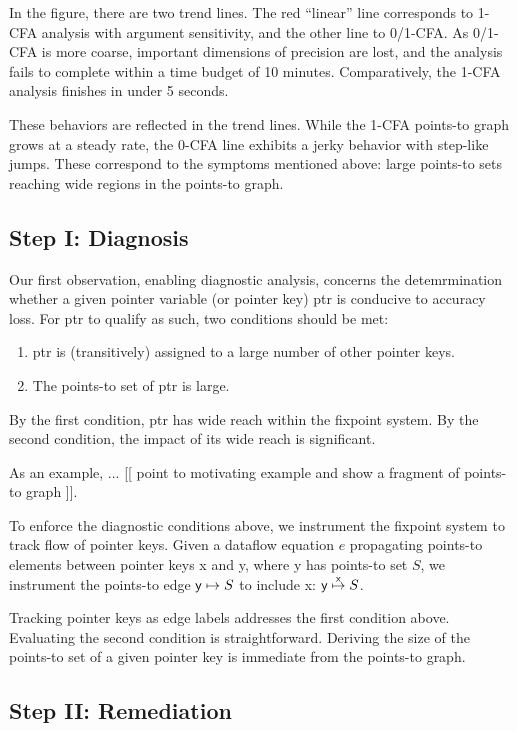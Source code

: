 \documentclass[a4paper,UKenglish]{lipics}
\begin{document}
In the figure, there are two trend lines. The red ``linear'' line corresponds to 1-CFA analysis with argument sensitivity, and the other line to 0/1-CFA. As 0/1-CFA is more coarse, important dimensions of precision are lost, and the analysis fails to complete within a time budget of 10 minutes. Comparatively, the 1-CFA analysis finishes in under 5 seconds.

These behaviors are reflected in the trend lines. While the 1-CFA points-to graph grows at a steady rate, the 0-CFA line exhibits a jerky behavior with step-like jumps. These correspond to the symptoms mentioned above: large points-to sets reaching wide regions in the points-to graph.

\subsection{Step I: Diagnosis}

Our first observation, enabling diagnostic analysis, concerns the detemrmination whether a given pointer variable (or pointer key) {\sf ptr} is conducive to accuracy loss. For {\sf ptr} to qualify as such, two conditions should be met:
\begin{enumerate}
	\item {\sf ptr} is (transitively) assigned to a large number of other pointer keys.
	\item The points-to set of {\sf ptr} is large.
\end{enumerate}
By the first condition, {\sf ptr} has wide reach within the fixpoint system. By the second condition, the impact of its wide reach is significant.

As an example, ... [[ point to motivating example and show a fragment of points-to graph ]].

To enforce the diagnostic conditions above, we instrument the fixpoint system to track flow of pointer keys. Given a dataflow equation $e$ propagating points-to elements between pointer keys {\sf x} and {\sf y}, where {\sf y} has points-to set $S$, we instrument the points-to edge ${\sf y} \mapsto S$ to include {\sf x}: ${\sf y} \stackrel{{\sf x}}{\mapsto} S$.

Tracking pointer keys as edge labels addresses the first condition above. Evaluating the second condition is straightforward. Deriving the size of the points-to set of a given pointer key is immediate from the points-to graph.

\subsection{Step II: Remediation}
\end{document}
